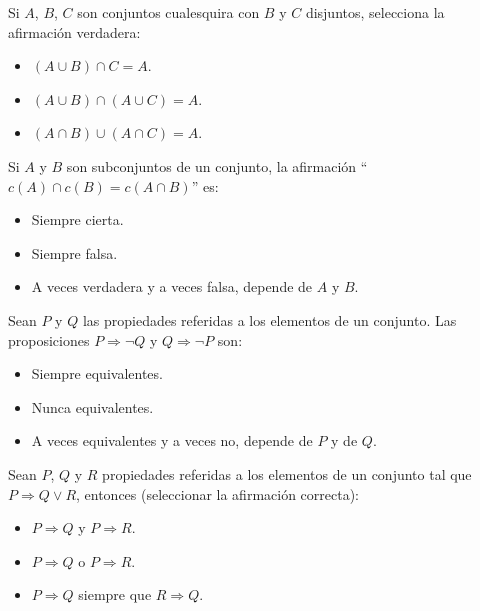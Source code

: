 \documentclass[12pt]{article}
\newcounter{ejercicio}[section] %
\newcounter{ejercicio}
\begin{document}
    \begin{ejercicio}
        Si $A$, $B$, $C$ son conjuntos cualesquira con $B$ y $C$ disjuntos, selecciona la afirmación verdadera:
        \begin{itemize}
            \item $(A \cup B)\cap C = A$.
            \item $(A \cup B)\cap (A \cup C)=A$.
            \item $(A\cap B)\cup(A \cap C)=A$.
        \end{itemize}
    \end{ejercicio}

    \begin{ejercicio}
        Si $A$ y $B$ son subconjuntos de un conjunto, la afirmación \newline ``$c(A) \cap c(B) = c(A \cap B)$'' es:
        \begin{itemize}
            \item Siempre cierta.
            \item Siempre falsa.
            \item A veces verdadera y a veces falsa, depende de $A$ y $B$.
        \end{itemize}
    \end{ejercicio}

    \begin{ejercicio}
        Sean $P$ y $Q$ las propiedades referidas a los elementos de un conjunto. Las proposiciones $P \Rightarrow \neg Q$ y $Q \Rightarrow \neg P$ son:
        \begin{itemize}
            \item Siempre equivalentes.
            \item Nunca equivalentes.
            \item A veces equivalentes y a veces no, depende de $P$ y de $Q$.
        \end{itemize}
    \end{ejercicio}

    \begin{ejercicio}
        Sean $P$, $Q$ y $R$ propiedades referidas a los elementos de un conjunto tal que $P \Rightarrow Q \lor R$, entonces (seleccionar la afirmación correcta):
        \begin{itemize}
            \item $P \Rightarrow Q$ y $P \Rightarrow R$.
            \item $P \Rightarrow Q$ o $P \Rightarrow R$.
            \item $P \Rightarrow Q$ siempre que $R \Rightarrow Q$.
        \end{itemize}
    \end{ejercicio}
\end{document}
